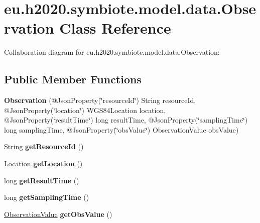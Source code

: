\hypertarget{classeu_1_1h2020_1_1symbiote_1_1model_1_1data_1_1Observation}{}\section{eu.\+h2020.\+symbiote.\+model.\+data.\+Observation Class Reference}
\label{classeu_1_1h2020_1_1symbiote_1_1model_1_1data_1_1Observation}


Collaboration diagram for eu.\+h2020.\+symbiote.\+model.\+data.\+Observation\+:
\subsection*{Public Member Functions}
\begin{DoxyCompactItemize}
\item 
\mbox{\label{classeu_1_1h2020_1_1symbiote_1_1model_1_1data_1_1Observation_a06ebedac4174460b6083121c9b8a28b0}} 
{\bfseries Observation} (@Json\+Property(\char`\"{}resource\+Id\char`\"{}) String resource\+Id, @Json\+Property(\char`\"{}location\char`\"{}) W\+G\+S84\+Location location, @Json\+Property(\char`\"{}result\+Time\char`\"{}) long result\+Time, @Json\+Property(\char`\"{}sampling\+Time\char`\"{}) long sampling\+Time, @Json\+Property(\char`\"{}obs\+Value\char`\"{}) Observation\+Value obs\+Value)
\item 
\mbox{\label{classeu_1_1h2020_1_1symbiote_1_1model_1_1data_1_1Observation_a2558e2834d65e1ee7045fdc8da44de77}} 
String {\bfseries get\+Resource\+Id} ()
\item 
\mbox{\label{classeu_1_1h2020_1_1symbiote_1_1model_1_1data_1_1Observation_ad636bbd87aa16bda6898e95f3bc37022}} 
\hyperlink{classeu_1_1h2020_1_1symbiote_1_1model_1_1data_1_1Location}{Location} {\bfseries get\+Location} ()
\item 
\mbox{\label{classeu_1_1h2020_1_1symbiote_1_1model_1_1data_1_1Observation_a07eb5a0f51be6ccd93800c5d76056c84}} 
long {\bfseries get\+Result\+Time} ()
\item 
\mbox{\label{classeu_1_1h2020_1_1symbiote_1_1model_1_1data_1_1Observation_a6a29cc02abb9ff6d38f505b2d42492f6}} 
long {\bfseries get\+Sampling\+Time} ()
\item 
\mbox{\label{classeu_1_1h2020_1_1symbiote_1_1model_1_1data_1_1Observation_aca8fa2585786d9dac2be8ff1927b4d21}} 
\hyperlink{classeu_1_1h2020_1_1symbiote_1_1model_1_1data_1_1ObservationValue}{Observation\+Value} {\bfseries get\+Obs\+Value} ()
\end{DoxyCompactItemize}

